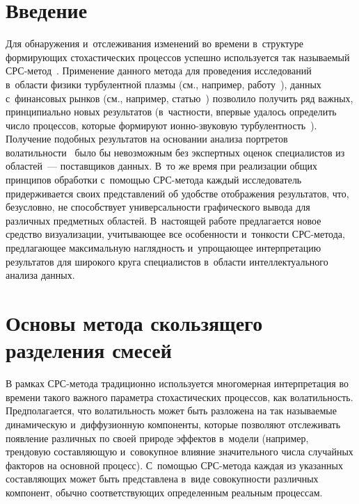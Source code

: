 \begin{multicols}{2}

\label{st\stat}

\section{Введение}

Для обнаружения и~отслеживания изменений во времени в~структуре формирующих
стохастических процессов успешно используется так называемый 
СРС-ме\-тод~\cite{Korolev2011}.
Применение \mbox{данного} мето\-да для проведения исследований в~области физики
турбулентной плазмы (см., например, работу~\cite{Skvortsova2006}), данных
с~финансовых рынков (см.,
например, \mbox{статью}~\cite{Gorshenin2008}) позволило получить ряд \mbox{важных}, принципиально
новых результатов
(в~част\-ности, впервые удалось определить число процессов, которые формируют
ион\-но-зву\-ко\-вую
турбулентность~\cite{Gorshenin2011MM1}). Получе\-ние подобных результатов на основании
анализа порт\-ре\-тов волатильности~\cite{Korolev2011} было бы невозможным без экспертных оценок
специалистов из областей~--- поставщиков данных. В~то же время при реализации общих принципов
обработки с~помощью СРС-метода каждый исследователь придерживается своих представлений об удобстве
отображения результатов, что, безусловно, не способствует универсальности графического вывода для
различных предметных областей. В~на\-сто\-ящей работе предлагается новое средство визуализации,
учитывающее все особенности и~тонкости СРС-ме\-то\-да, предлагающее максимальную наглядность и~упрощающее
интерпретацию результатов для широкого круга специалистов в~области интеллектуального анализа данных.

\section{Основы метода скользящего разделения смесей}

В рамках СРС-метода традиционно используется многомерная интерпретация
во времени такого важного
параметра стохастических процессов, как волатильность. Предполагается, что
волатильность может быть разложена на так называемые динамическую и~диффузионную
компоненты, которые позволяют отслеживать появление различных по своей природе
эффектов в~модели
(например, трендовую составляющую и~совокупное влияние значительного числа случайных факторов на
основной процесс). С~помощью СРС-метода каждая из указанных составляющих может
быть представлена в~виде совокупности
различных компонент, обычно соответствующих определенным реальным про\-цессам.


\end{multicols}
